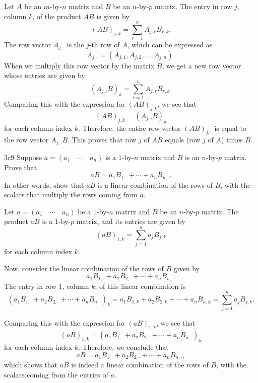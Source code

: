 \begin{sol}
    Let $A$ be an $m$-by-$n$ matrix and $B$ be an $n$-by-$p$ matrix.
	The entry in row $j$, column $k$, of the product $AB$ is given by
    \[
    	(AB)_{j, k} = \sum_{r = 1}^{n} A_{j, r} B_{r, k}.
    \]
    The row vector $A_{j, \cdot}$ is the $j$-th row of $A$, which can be expressed as
    \[
    	A_{j, \cdot} = (A_{j, 1}, A_{j, 2}, \ldots, A_{j, n}).
    \]
    When we multiply this row vector by the matrix $B$, we get a new row vector whose entries are given by
    \[
    	(A_{j, \cdot} B)_k = \sum_{r = 1}^{n} A_{j, r} B_{r, k}.
    \]
    Comparing this with the expression for $(AB)_{j, k}$, we see that
    \[
    	(AB)_{j, k} = (A_{j, \cdot} B)_k
    \]
    for each column index $k$.
	Therefore, the entire row vector $(AB)_{j, \cdot}$ is equal to the row vector $A_{j, \cdot} B$.
	This proves that row $j$ of $AB$ equals (row $j$ of $A$) times $B$.
\end{sol}

\begin{exercise}{3c9}
    Suppose $a = (a_1 \quad \cdots \quad a_n)$ is a $1$-by-$n$ matrix and $B$ is an $n$-by-$p$ matrix.
	Prove that
    \[
    	aB = a_1 B_{1, \cdot} + \cdots + a_n B_{n, \cdot}.
    \]
    In other words, show that $aB$ is a linear combination of the rows of $B$, with the scalars that multiply the rows coming from $a$.
\end{exercise}

\begin{sol}
    Let $a = (a_1 \quad \cdots \quad a_n)$ be a $1$-by-$n$ matrix and $B$ be an $n$-by-$p$ matrix.
	The product $aB$ is a $1$-by-$p$ matrix, and its entries are given by
    \[
    	(aB)_{1, k} = \sum_{j = 1}^{n} a_j B_{j, k}
    \]
    for each column index $k$. 

    Now, consider the linear combination of the rows of $B$ given by
    \[
    	a_1 B_{1, \cdot} + a_2 B_{2, \cdot} + \cdots + a_n B_{n, \cdot}.
    \]
    The entry in row $1$, column $k$, of this linear combination is
    \[
    	(a_1 B_{1, \cdot} + a_2 B_{2, \cdot} + \cdots + a_n B_{n, \cdot})_k = a_1 B_{1, k} + a_2 B_{2, k} + \cdots + a_n B_{n, k} = \sum_{j = 1}^{n} a_j B_{j, k}.
    \]

    Comparing this with the expression for $(aB)_{1, k}$, we see that
    \[
    	(aB)_{1, k} = (a_1 B_{1, \cdot} + a_2 B_{2, \cdot} + \cdots + a_n B_{n, \cdot})_k
    \]
    for each column index $k$.
	Therefore, we conclude that
    \[
    	aB = a_1 B_{1, \cdot} + a_2 B_{2, \cdot} + \cdots + a_n B_{n, \cdot},
    \]
    which shows that $aB$ is indeed a linear combination of the rows of $B$, with the scalars coming from the entries of $a$.
\end{sol}

